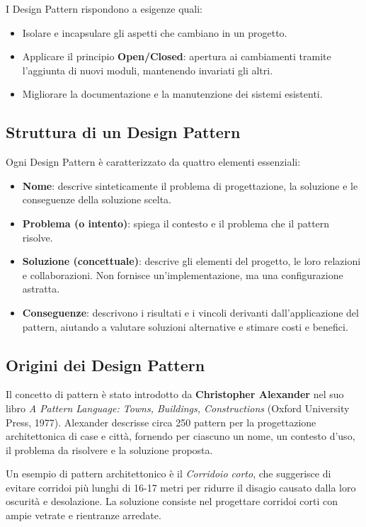 I Design Pattern rispondono a esigenze quali:
\begin{itemize}
    \item Isolare e incapsulare gli aspetti che cambiano in un progetto.
    \item Applicare il principio \textbf{Open/Closed}: apertura ai cambiamenti tramite l’aggiunta di nuovi moduli, mantenendo invariati gli altri.
    \item Migliorare la documentazione e la manutenzione dei sistemi esistenti.
\end{itemize}

\subsection{Struttura di un Design Pattern}
Ogni Design Pattern è caratterizzato da quattro elementi essenziali:
\begin{itemize}
    \item \textbf{Nome}: descrive sinteticamente il problema di progettazione, la soluzione e le conseguenze della soluzione scelta.
    \item \textbf{Problema (o intento)}: spiega il contesto e il problema che il pattern risolve.
    \item \textbf{Soluzione (concettuale)}: descrive gli elementi del progetto, le loro relazioni e collaborazioni. Non fornisce un’implementazione, ma una configurazione astratta.
    \item \textbf{Conseguenze}: descrivono i risultati e i vincoli derivanti dall’applicazione del pattern, aiutando a valutare soluzioni alternative e stimare costi e benefici.
\end{itemize}

\subsection{Origini dei Design Pattern}
Il concetto di pattern è stato introdotto da \textbf{Christopher Alexander} nel suo libro \textit{A Pattern Language: Towns, Buildings, Constructions} (Oxford University Press, 1977). Alexander descrisse circa 250 pattern per la progettazione architettonica di case e città, fornendo per ciascuno un nome, un contesto d’uso, il problema da risolvere e la soluzione proposta.

Un esempio di pattern architettonico è il \textit{Corridoio corto}, che suggerisce di evitare corridoi più lunghi di 16-17 metri per ridurre il disagio causato dalla loro oscurità e desolazione. La soluzione consiste nel progettare corridoi corti con ampie vetrate e rientranze arredate.

